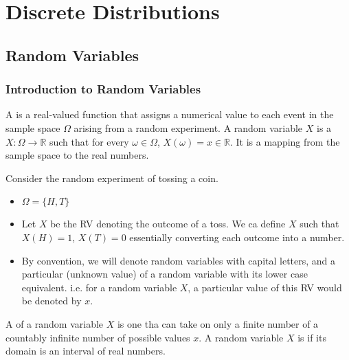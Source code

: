 \chapter{Discrete Distributions}

\section{Random Variables}

\subsection{Introduction to Random Variables}

\begin{definition}
    A  is a real-valued function that assigns a numerical value to each event in the sample space $\Omega$ arising from a random experiment. A random variable $X$ is a  $X : \Omega \to \mathbb{R}$ such that for every $\omega \in \Omega$, $X(\omega) = x \in \mathbb{R}$. It is a mapping from the sample space to the real numbers.
\end{definition}

\begin{example}
    Consider the random experiment of tossing a coin. 

    \begin{itemize}
        \item $\Omega = \{ H, T \}$
        \item Let $X$ be the RV denoting the outcome of a toss. We ca define $X$ such that $X(H) = 1$, $X(T) = 0$ essentially converting each outcome into a number. 
        \item By convention, we will denote random variables with capital letters, and a particular (unknown value) of a random variable with its lower case equivalent. i.e. for a random variable $X$, a particular value of this RV would be denoted by $x$.
    \end{itemize}
\end{example}

\begin{definition}
    A  of a random variable $X$ is one tha can take on only a finite number of a countably infinite number of possible values $x$. A random variable $X$ is  if its domain is an interval of real numbers. 
\end{definition}

